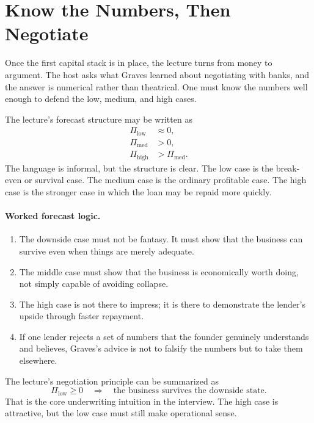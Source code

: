 \section{Know the Numbers, Then Negotiate}

Once the first capital stack is in place, the lecture turns from money to argument. The host asks what Graves learned about negotiating with banks, and the answer is numerical rather than theatrical. One must know the numbers well enough to defend the low, medium, and high cases.

The lecture's forecast structure may be written as
\begin{align}
\Pi_{\mathrm{low}} &\approx 0,\\
\Pi_{\mathrm{med}} &> 0,\\
\Pi_{\mathrm{high}} &> \Pi_{\mathrm{med}}.
\end{align}
The language is informal, but the structure is clear. The low case is the break-even or survival case. The medium case is the ordinary profitable case. The high case is the stronger case in which the loan may be repaid more quickly.

\paragraph{Worked forecast logic.}
\begin{enumerate}
\item The downside case must not be fantasy. It must show that the business can survive even when things are merely adequate.
\item The middle case must show that the business is economically worth doing, not simply capable of avoiding collapse.
\item The high case is not there to impress; it is there to demonstrate the lender's upside through faster repayment.
\item If one lender rejects a set of numbers that the founder genuinely understands and believes, Graves's advice is not to falsify the numbers but to take them elsewhere.
\end{enumerate}

The lecture's negotiation principle can be summarized as
\begin{equation}
\Pi_{\mathrm{low}} \ge 0
\quad\Longrightarrow\quad
\text{the business survives the downside state.}
\end{equation}
That is the core underwriting intuition in the interview. The high case is attractive, but the low case must still make operational sense.

